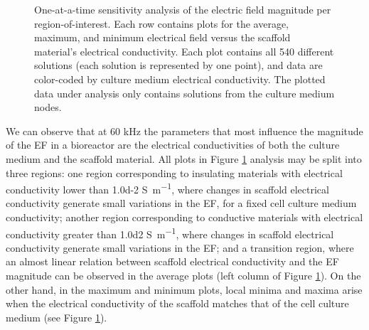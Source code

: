 \begin{figure}
\caption{One-at-a-time sensitivity analysis of the electric field magnitude per region-of-interest. Each row contains plots for the average, maximum, and minimum electrical field versus the scaffold material's electrical conductivity. Each plot contains all 540 different solutions (each solution is represented by one point), and data are color-coded by culture medium electrical conductivity. The plotted data under analysis only contains solutions from the culture medium nodes.}
\label{fig5d8}
\end{figure}


\noindent We can observe that at 60 \si{\kilo\hertz} the parameters that most influence the magnitude of the \acs{EF} in a bioreactor are the electrical conductivities of both the culture medium and the scaffold material. All plots in Figure \ref{fig5d8} analysis may be split into three regions: one region corresponding to insulating materials with electrical conductivity lower than \num{1.0d-2} \si{\siemens\per\meter}, where changes in scaffold electrical conductivity generate small variations in the \acs{EF}, for a fixed cell culture medium conductivity; another region corresponding to conductive materials with electrical conductivity greater than \num{1.0d2} \si{\siemens\per\meter}, where changes in scaffold electrical conductivity generate small variations in the \acs{EF}; and a transition region, where an almost linear relation between scaffold electrical conductivity and the \acs{EF} magnitude can be observed in the average plots (left column of Figure \ref{fig5d8}). On the other hand, in the maximum and minimum plots, local minima and maxima arise when the electrical conductivity of the scaffold matches that of the cell culture medium (see Figure \ref{fig5d8}). \hfill \break


